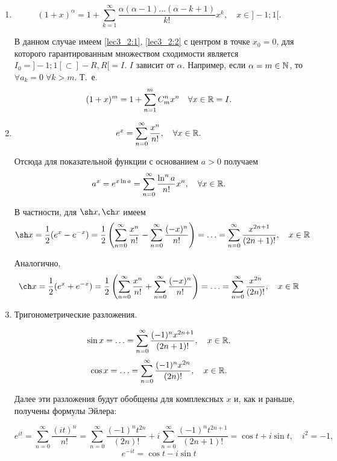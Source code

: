 \documentclass[../../main.tex]{subfiles}
\begin{document}
    \begin{enumerate}
        \item 
        \[(1 + x)^\alpha = 1 + \sum\limits_{k = 1}^{\infty} 
        \dfrac{\alpha(\alpha - 1)\ldots(\alpha - k + 1)}{k!}x^k, \quad x \in 
        ]-1; 1[.\]
        
        В данном случае имеем \eqref{lec3_2:1}, \eqref{lec3_2:2} с центром в 
        точке 
        $x_0 = 0$, для которого гарантированным множеством сходимости является 
        $I_0 = ]-1; 1[ \subset ]-R, R[ = I.$ $I$ зависит от $\alpha$. 
        Например, 
        если $\alpha = m \in \mathbb{N}$, то $\forall a_k = 0 \; \forall k > m$. Т.~е.
        \[(1 + x)^m = 1 + \sum\limits_{n = 1}^{m} C_m^n x^n \quad \forall x 
        \in \mathbb{R} = I.\]
        
        \item 
        \[e^x = \sum\limits_{n = 0}^{\infty} \frac{x^n}{n!},  \quad 
        \forall x \in \mathbb{R}.\]

        Отсюда для показательной функции с основанием $a > 0$ получаем
        \[ a^x = e^{x \ln a} = \sum\limits_{n = 0}^{\infty} 
        \frac{\ln^n a}{n!} x ^ n,  \quad \forall x \in \mathbb{R}.\]

        В частности, для $\sh x, \ch x$ имеем 
        \[\sh x = \frac12 (e^x - e^{-x}) = \frac12 
        \left(\sum\limits_{n = 0}^{\infty} \frac{x^n}{n!} - 
        \sum\limits_{n = 0}^{\infty} \frac{(-x)^n}{n!}\right) = \ldots =
        \sum\limits_{n = 0}^{\infty} \frac{x^{2n+1}}{(2n+1)!}, \quad x \in \R\]
    
        Аналогично,
        \[\ch x = \frac12 (e^x + e^{-x}) = \frac12 
        \left(\sum\limits_{n = 0}^{\infty} \frac{x^n}{n!} + 
        \sum\limits_{n = 0}^{\infty}\frac{(-x)^n}{n!}\right) = \ldots = 
        \sum\limits_{n = 0}^{\infty} \frac{x^{2n}}{(2n)!}, \quad x \in \R\]
    
        \item Тригонометрические разложения.
    
        \[\sin x = \ldots = \sum\limits_{n = 0}^{\infty} 
        \frac{(-1)^nx^{2n+1}}{(2n+1)!}, \quad x \in \mathbb{R}.\]
        \[\cos x = \ldots = \sum\limits_{n = 0}^{\infty} 
        \frac{(-1)^nx^{2n}}{(2n)!}, \quad x \in \mathbb{R}.\]
    
        Далее эти разложения будут обобщены для комплексных $x$ и, как 
        и раньше, получены формулы Эйлера:
    
        \[ e^{it} = \sum\limits_{n = 0}^{\infty} \frac{(it)^n}{n!} = 
        \sum\limits_{n = 0}^{\infty} \frac{(-1)^nt^{2n}}{(2n)!} + 
        i \sum\limits_{n = 0}^{\infty} \frac{(-1)^nt^{2n+1}}{(2n+1)!} 
        = \cos t + i \sin t, \quad i^2 = -1,\]
        \[e^{-it} = \cos t - i \sin t\]


\end{enumerate}
\end{document}
